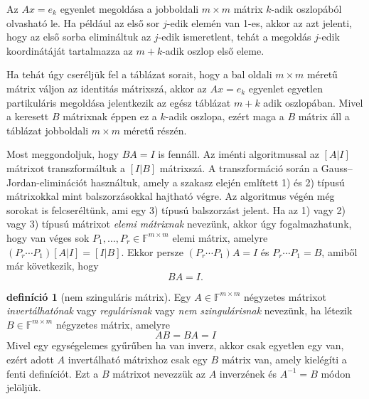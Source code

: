 \documentclass[9pt, a4paper, showtrims]{memoir}
\theoremstyle{plain}
\theoremstyle{remark}
\theoremstyle{definition}
\newtheorem{definition}[proposition]{definíció}
\begin{document}
Az $Ax=e_k$ egyenlet megoldása a jobboldali $m\times m$ mátrix $k$-adik oszlopából olvasható le. 
Ha például az első sor $j$-edik elemén van 1-es, 
akkor az azt jelenti, hogy az első sorba elimináltuk az $j$-edik ismeretlent, 
tehát a megoldás $j$-edik koordinátáját tartalmazza az $m+k$-adik oszlop első eleme.

Ha tehát úgy cseréljük fel a táblázat sorait, 
hogy a bal oldali $m\times m$ méretű mátrix váljon az identitás mátrixszá, 
akkor az $Ax=e_k$ egyenlet egyetlen partikuláris megoldása jelentkezik az egész táblázat
$m+k$ adik oszlopában.
Mivel a keresett $B$ mátrixnak éppen ez a $k$-adik oszlopa,
ezért maga a $B$ mátrix áll a táblázat jobboldali $m\times m$ méretű részén.

Most meggondoljuk, hogy $BA=I$ is fennáll.
Az iménti algoritmussal az $[A|I]$ mátrixot transzformáltuk a $[I|B]$ mátrixszá.
A transzformáció során a Gauss--Jordan-eliminációt használtuk,  amely a szakasz elején említett 1) és 2) típusú mátrixokkal mint balszorzásokkal hajtható végre.
Az algoritmus végén még sorokat is felcseréltünk, ami egy 3) típusú balszorzást jelent.
Ha az 1) vagy 2) vagy 3) típusú mátrixot \emph{elemi mátrixnak}
nevezünk, 
akkor úgy fogalmazhatunk, 
hogy van véges sok $P_1,\dots,P_r\in\mathbb{F}^{m\times m}$ elemi mátrix, amelyre
\(
(P_r\cdots P_1)\left[ A|I \right]=\left[ I|B \right].
\)
Ekkor persze $(P_r\cdots P_1)A=I$ és $P_r\cdots P_1=B$,
amiből már következik, hogy
\[
    BA=I.
\]

\begin{definition}[nem szinguláris mátrix]
    Egy $A\in\mathbb{F}^{m\times m}$ négyzetes mátrixot 
    \emph{invertálhatónak} vagy 
    \emph{regulárisnak} vagy \emph{nem szingulárisnak} nevezünk,
    ha létezik $B\in\mathbb{F}^{m\times m}$ négyzetes mátrix, 
    amelyre
    \[
        AB=BA=I
    \]
    Mivel egy egységelemes gyűrűben ha van inverz, akkor csak egyetlen egy van,
    ezért adott $A$ invertálható mátrixhoz csak egy $B$ mátrix van, amely kielégíti a fenti definíciót.
    Ezt a $B$ mátrixot nevezzük az $A$ inverzének és $A^{-1}=B$ módon jelöljük.
\end{definition}
\end{document}

